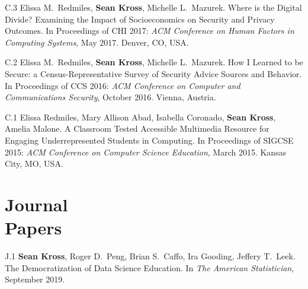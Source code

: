 \begin{bibenum}
\item[C.3] Elissa M.\ Redmiles, \textbf{Sean Kross}, Michelle L.\ Mazurek. 
Where is the Digital Divide? Examining the Impact of Socioeconomics on Security 
and Privacy Outcomes. In Proceedings of CHI 2017: \emph{ACM Conference on 
Human Factors in Computing Systems}, May 2017. Denver, CO, USA.

\item[C.2] Elissa M.\ Redmiles, \textbf{Sean Kross}, Michelle L.\ Mazurek. How 
I Learned to be Secure: a Census-Representative Survey of Security Advice 
Sources and Behavior. In Proceedings of CCS 2016: \emph{ACM Conference on 
Computer and Communications Security}, October 2016. Vienna, Austria.

\item[C.1] Elissa Redmiles, Mary Allison Abad, Isabella Coronado, 
\textbf{Sean Kross}, Amelia Malone. A Classroom Tested Accessible Multimedia 
Resource for Engaging Underrepresented Students in Computing. In Proceedings of
SIGCSE 2015: \emph{ACM Conference on Computer Science Education}, March 2015. 
Kansas City, MO, USA.

\end{bibenum}

\vspace{0.1in}





\section{Journal \\ Papers}

\begin{bibenum}

\item[J.1] \textbf{Sean Kross}, Roger D.\ Peng, Brian S.\ Caffo, Ira Gooding,
Jeffery T.\ Leek. The Democratization of Data Science Education. 
In \emph{The American Statistician}, September 2019.

\end{bibenum}

